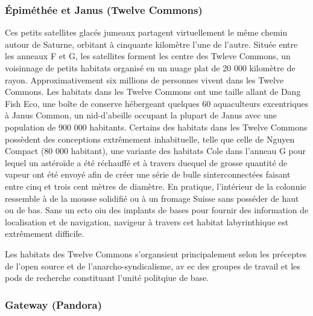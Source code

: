                                                                      \subsubsection{Épiméthée et Janus (Twelve Commons)} \label{sec:epim-janus-twelve} 

                                                                     Ces petits satellites glacés jumeaux partagent virtuellement le même chemin autour de Saturne, orbitant à cinquante kilomètre l'une de l'autre. Située entre les anneaux F et G, les satellites forment les centre des Twleve Commons, un voisinnage de petits habitats organisé en un nuage plat de 20 000 kilomètre de rayon. Approximativement six millions de personnes vivent dans les Twelve Commons. Les habitats dans les Twelve Commons ont une taille allant de Dang Fish Eco, une boîte de conserve hébergeant quelques 60 aquaculteurs excentriques à Janus Common, un nid-d'abeille occupant la plupart de Janus avec une population de 900 000 habitants. Certains des habitats dans les Twelve Commons possèdent des conceptions extrêmement inhabituelle, telle que celle de Nguyen Compact (80 000 habitant), une variante des habitats Cole dans l'anneau G pour lequel un astéroïde a été réchauffé et à travers duequel de grosse quantité de vapeur ont été envoyé afin de créer une série de bulle sinterconnectées faisant entre cinq et trois cent mètres de diamètre. En pratique, l'intérieur de la colonnie ressemble à de la mousse solidifié ou à un fromage Suisse sans posséder de haut ou de bas. Sans un ecto oiu des implants de bases pour fournir des information de localisation et de navigation, navigeur à travers cet habitat labyrinthique est extrêmement difficile. 

                                                                     Les habitats des Twelve Commons s'organsient principalement selon les préceptes de l'open source et de l'anarcho-syndicalisme, av ec des groupes de travail et les pods de recherche constituant l'unité politqiue de base. 

                                                                     \subsubsection{Gateway (Pandora)} \label{sec:gateway-pandora} 

